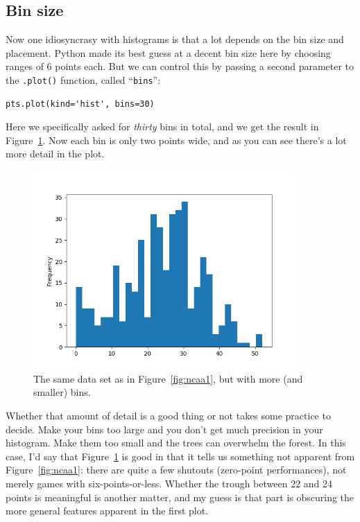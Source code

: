 \subsection{Bin size}


Now one idiosyncrasy with histograms is that a lot depends on the bin size and
placement. Python made its best guess at a decent bin size here by choosing
ranges of 6 points each. But we can control this by passing a second parameter
to the \texttt{.plot()} function, called ``\texttt{bins}'':

\begin{Verbatim}[fontsize=\small,samepage=true,frame=single,framesep=3mm]
pts.plot(kind='hist', bins=30)
\end{Verbatim}

Here we specifically asked for \textit{thirty} bins in total, and we get the
result in Figure~\ref{fig:ncaa2}. Now each bin is only two points wide, and as
you can see there's a lot more detail in the plot.

\begin{figure}[ht]
\centering
\includegraphics[width=0.9\textwidth]{ncaa2.png}
\caption{The same data set as in Figure~\ref{fig:ncaa1}, but with more (and
smaller) bins.}
\label{fig:ncaa2}
\end{figure}

Whether that amount of detail is a good thing or not takes some practice to
decide. Make your bins too large and you don't get much precision in your
histogram. Make them too small and the trees can overwhelm the forest. In this
case, I'd say that Figure~\ref{fig:ncaa2} is good in that it tells us something
not apparent from Figure~\ref{fig:ncaa1}: there are quite a few shutouts
(zero-point performances), not merely games with six-points-or-less. Whether
the trough between 22 and 24 points is meaningful is another matter, and my
guess is that part is obscuring the more general features apparent in the first
plot.


